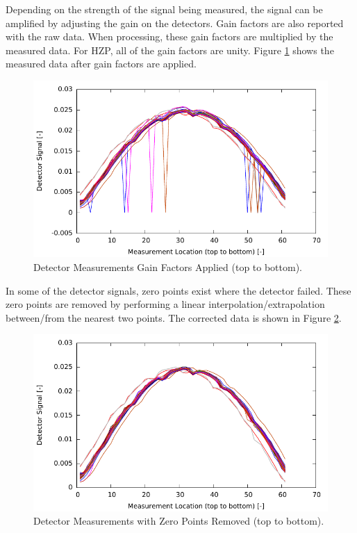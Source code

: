 Depending on the strength of the signal being measured, the signal can be amplified
by adjusting the gain on the detectors.  Gain factors are also reported with the raw data.  When 
processing, these gain factors are multiplied by the measured data.  For \ac{HZP}, all 
of the gain factors are unity.  Figure \ref{fig:gain_all} shows the measured data 
after gain factors are applied.
\begin{figure}
    \centering
    \includegraphics{expdata/figs/gain_all.pdf}
    \caption{Detector Measurements Gain Factors Applied (top to bottom). \label{fig:gain_all}}
\end{figure}

In some of the detector signals, zero points exist where the detector failed.  These zero points are removed by performing
a linear interpolation/extrapolation between/from the nearest two points.  The corrected data is shown 
in Figure \ref{fig:zero}.
\begin{figure}
    \centering
    \includegraphics{expdata/figs/zeros_all.pdf}
    \caption{Detector Measurements with Zero Points Removed (top to bottom). \label{fig:zero}}
\end{figure}

